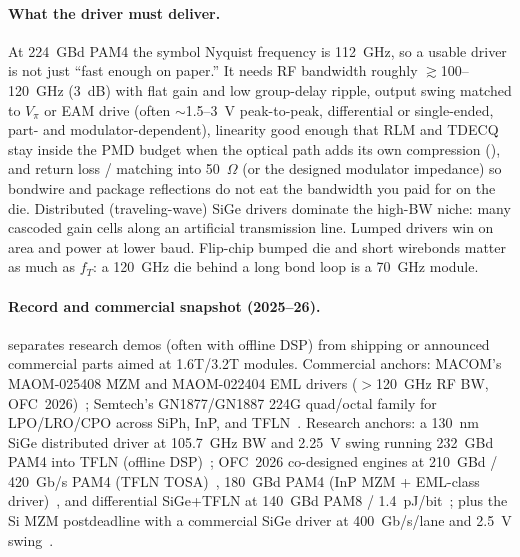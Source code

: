 \paragraph{What the driver must deliver.}
At 224~GBd PAM4 the symbol Nyquist frequency is 112~GHz, so a usable driver is
not just ``fast enough on paper.'' It needs RF bandwidth roughly
$\gtrsim$100--120~GHz (3~dB) with flat gain and low group-delay ripple, output
swing matched to $V_\pi$ or EAM drive (often $\sim$1.5--3~V peak-to-peak,
differential or single-ended, part- and modulator-dependent), linearity good
enough that RLM and TDECQ stay inside the PMD budget when the optical path adds
its own compression (), and return loss / matching into
50~$\Omega$ (or the designed modulator impedance) so bondwire and package
reflections do not eat the bandwidth you paid for on the die.
Distributed (traveling-wave) SiGe drivers dominate the high-BW niche: many
cascoded gain cells along an artificial transmission line. Lumped drivers win on
area and power at lower baud. Flip-chip bumped die and short wirebonds matter as
much as $f_T$: a 120~GHz die behind a long bond loop is a 70~GHz module.

\paragraph{Record and commercial snapshot (2025--26).}
 separates research demos (often with offline DSP) from
shipping or announced commercial parts aimed at 1.6T/3.2T modules. Commercial
anchors: MACOM's MAOM-025408 MZM and MAOM-022404 EML drivers ($>$120~GHz RF BW,
OFC~2026)~; Semtech's GN1877/GN1887 224G quad/octal family for
LPO/LRO/CPO across SiPh, InP, and TFLN~. Research anchors:
a 130~nm SiGe distributed driver at 105.7~GHz BW and 2.25~V swing running
232~GBd PAM4 into TFLN (offline DSP)~; OFC~2026 co-designed
engines at 210~GBd / 420~Gb/s PAM4 (TFLN TOSA)~, 180~GBd
PAM4 (InP MZM + EML-class driver)~, and differential
SiGe+TFLN at 140~GBd PAM8 / 1.4~pJ/bit~; plus the Si MZM
postdeadline with a commercial SiGe driver at 400~Gb/s/lane and 2.5~V
swing~.

